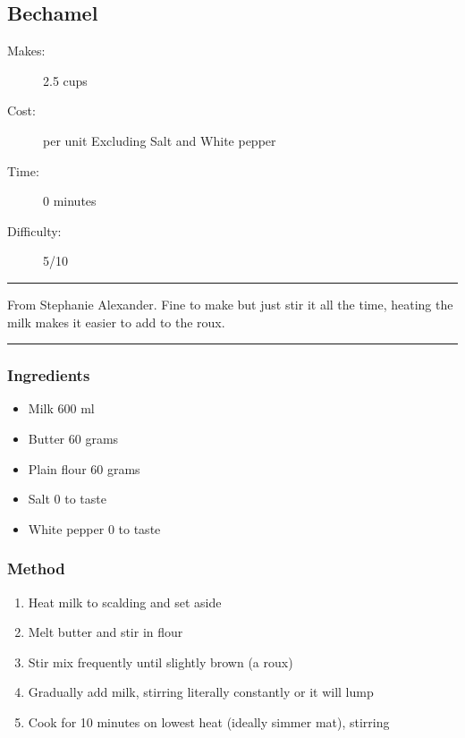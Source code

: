 \documentclass[]{article}
\begin{document}
\subsection*{\center\huge Bechamel}
\begin{description}
\item[Makes:] 2.5 cups
\item[Cost:]  per unit Excluding Salt and White pepper
\item[Time:] 0 minutes
\item[Difficulty:] 5/10
\end{description}
\vspace{0.2cm}\hrule\vspace{0.5cm}
\begin{adjustwidth}{0.5 cm}{0.5 cm}

From Stephanie Alexander. Fine to make but just stir it all the time, heating the milk makes it easier to add to the roux. \hfill\color{accent}{\Large\faVimeoSquare\hspace{0.1cm}\faTruck\hspace{0.1cm}}\color{black}

\end{adjustwidth}
\vspace{0.5cm}\hrule
\subsubsection*{\Large Ingredients}
\begin{multicols}{2}
\begin{itemize}
 \item Milk \hfill 600 ml
 \item Butter \hfill 60 grams
 \item Plain flour \hfill 60 grams
 \item Salt \hfill 0 to taste
 \item White pepper \hfill 0 to taste
\end{itemize}
\end{multicols}
\subsubsection*{\Large Method}
\begin{enumerate}[font=\huge\color{accent}]
	\item Heat milk to scalding and set aside
	\item Melt butter and stir in flour
	\item Stir mix frequently until slightly brown (a roux)
	\item Gradually add milk, stirring literally constantly or it will lump
	\item Cook for 10 minutes on lowest heat (ideally simmer mat), stirring
\end{enumerate}
\newpage
{}
\end{document}
